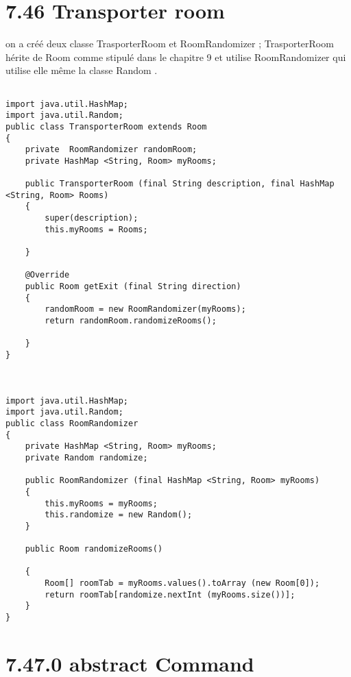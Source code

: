 \documentclass[a4paper , 10pt]{article}
\begin{document}
\section{7.46 Transporter room }
on a créé deux classe TrasporterRoom et RoomRandomizer ; TrasporterRoom hérite de Room comme stipulé dans le chapitre 9 et utilise RoomRandomizer qui utilise elle même la classe Random .
\begin{verbatim}

import java.util.HashMap;
import java.util.Random;
public class TransporterRoom extends Room
{
    private  RoomRandomizer randomRoom;
    private HashMap <String, Room> myRooms;

    public TransporterRoom (final String description, final HashMap <String, Room> Rooms)
    {
        super(description);
        this.myRooms = Rooms;

    }

    @Override
    public Room getExit (final String direction)
    {
        randomRoom = new RoomRandomizer(myRooms);
        return randomRoom.randomizeRooms();

    }
}



import java.util.HashMap;
import java.util.Random;
public class RoomRandomizer
{
    private HashMap <String, Room> myRooms;
    private Random randomize;

    public RoomRandomizer (final HashMap <String, Room> myRooms)
    {
        this.myRooms = myRooms;
        this.randomize = new Random();
    }

    public Room randomizeRooms()

    {
        Room[] roomTab = myRooms.values().toArray (new Room[0]);
        return roomTab[randomize.nextInt (myRooms.size())];
    }
}
\end{verbatim}

\section{7.47.0 abstract Command }
\end{document}
